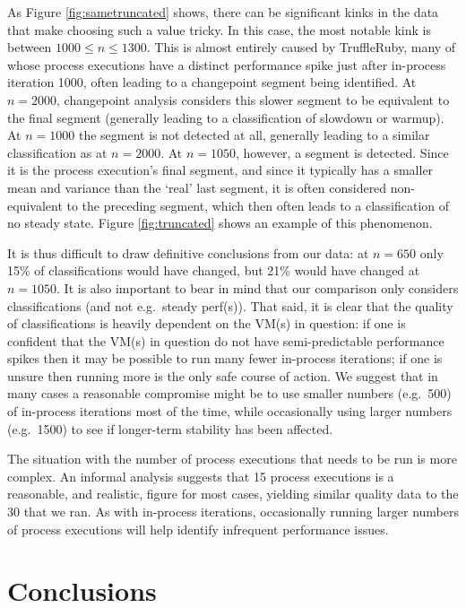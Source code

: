 \documentclass[acmsmall]{acmart}\settopmatter{printfolios=true}
\begin{document}
As Figure \ref{fig:sametruncated} shows, there can be significant
kinks in the data that make choosing such a value tricky. In this case, the most
notable kink is between $1000 \leq n \leq 1300$. This is almost entirely caused by
TruffleRuby, many of whose process executions have a distinct performance spike
just after in-process iteration 1000, often leading to a changepoint
segment being identified. At $n=2000$, changepoint analysis considers this slower
segment to be equivalent to the final segment (generally leading to a classification
of slowdown or warmup). At $n=1000$ the segment is not detected at all, generally
leading to a similar classification as at $n=2000$. At $n=1050$, however, a
segment is detected. Since it is the process execution's final segment,
and since it typically has a smaller mean and variance than the `real' last
segment, it is often considered non-equivalent to the preceding segment,
which then often leads to a classification of no steady state.
Figure \ref{fig:truncated} shows an example of this phenomenon.

It is thus difficult to draw definitive conclusions from our data:
at $n=650$ only 15\% of classifications would have changed,
but 21\% would have changed at $n=1050$. It is also important to bear in mind
that our comparison only considers classifications (and not e.g.~steady perf(s)).
That said, it is clear that the quality of classifications
is heavily dependent on the VM(s) in question: if one is confident that the VM(s) in question do not have
semi-predictable performance spikes then it may be possible to run many fewer
in-process iterations; if one is unsure then running more is the only safe
course of action. We suggest that in many cases a reasonable compromise might be to
use smaller numbers (e.g.~500) of in-process iterations most
of the time, while occasionally using larger numbers (e.g.~1500) to see if
longer-term stability has been affected.

The situation with the number of process executions that needs to be run
is more complex. An informal analysis suggests that
15 process executions is a reasonable, and realistic, figure for most
cases, yielding similar quality data to the 30 that we ran. As with in-process
iterations, occasionally running larger numbers of process executions will help
identify infrequent performance issues.


\section{Conclusions}
\label{sec:conclusions}
\end{document}
